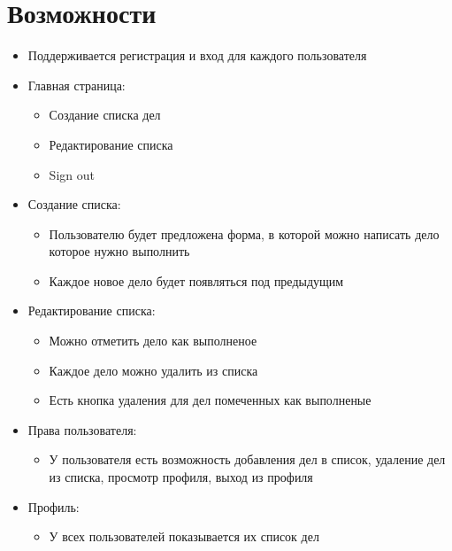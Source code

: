 \documentclass[a4paper,14pt]{extarticle} %
\begin{document}
\section * {Возможности} 
\begin{itemize} 
\item{Поддерживается регистрация и вход для каждого пользователя}
\item{Главная страница:} 
\begin{itemize} 
\item{Создание списка дел}
\item{Редактирование списка}
\item{Sign out}
\end{itemize} 
\item{Создание списка:} 
\begin{itemize} 
\item{Пользователю будет предложена форма, в которой можно написать дело которое нужно выполнить}
\item{Каждое новое дело будет появляться под предыдущим}
\end{itemize}
\item{Редактирование списка:}
\begin{itemize}
\item{Можно отметить дело как выполненое}
\item{Каждое дело можно удалить из списка}
\item{Есть кнопка удаления для дел помеченных как выполненые}
\end{itemize}
\item{Права пользователя:}
\begin{itemize}
\item{У пользователя есть возможность добавления дел в список, удаление дел из списка, просмотр профиля, выход из профиля}
\end{itemize}
\item{Профиль:}
\begin{itemize}
\item{У всех пользователей показывается их список дел}
\end{itemize}
\end{itemize}
\end{document}
